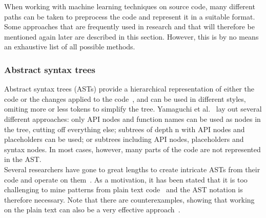 \documentclass[
a4paper,
pagesize,
pdftex,
12pt,
twoside, %
BCOR=5mm, %
ngerman,
fleqn,
final,
]{scrartcl}
\begin{document}
	When working with machine learning techniques on source code, many different paths can be taken to preprocess the code and represent it in a suitable format. Some approaches that are frequently used in research and that will therefore be mentioned again later are described in this section. However, this is by no means an exhaustive list of all possible methods. 
	
	\subsubsection{Abstract syntax trees}
	Abstract syntax trees (ASTs) provide a hierarchical representation of either the code or the changes applied to the code~\cite{Liu.2018}, and can be used in different styles, omiting more or less tokens to simplify the tree. Yamaguchi et al.~\cite{Yamaguchi.2012} lay out several different approaches: only API nodes and function names can be used as nodes in the tree, cutting off everything else; subtrees of depth n with API nodes and placeholders can be used; or subtrees including API nodes, placeholders and syntax nodes. In most cases, however, many parts of the code are not represented in the AST.\\ Several researchers have gone to great lengths to create intricate ASTs from their code and operate on them~\cite{Ma.2017,Yamaguchi.2012}. As a motivation, it has been stated that it is too challenging to mine patterns from plain text code~\cite{Liu.2018} and the AST notation is therefore necessary. Note that there are counterexamples, showing that working on the plain text can also be a very effective approach~\cite{Russell.2018,Hovsepyan.2012}.\\
	
\end{document}
